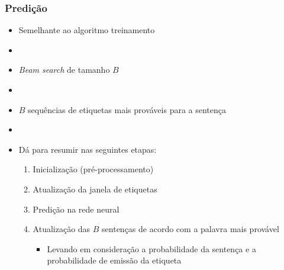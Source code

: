 \documentclass[10pt]{beamer}
\begin{document}
\begin{frame}[fragile]
\frametitle{Predição}
  
  


  \begin{itemize}

    \item Semelhante ao algoritmo treinamento

    \item[\ ] \   

    \item \textit{Beam search} de tamanho $B$

    \item[\ ] \   

    \item $B$ sequências de etiquetas mais prováveis para a sentença

    \item[\ ] \   

    \item Dá para resumir nas seguintes etapas:

    \begin{enumerate}
      \item Inicialização (pré-processamento)
      \item Atualização da janela de etiquetas
      \item Predição na rede neural 
      \item Atualização das $B$ sentenças de acordo com a palavra mais provável
      \begin{itemize}
        \item[-] Levando em consideração a probabilidade da sentença e a probabilidade de emissão da etiqueta
      \end{itemize}
    \end{enumerate}

  \end{itemize}

\end{frame}
\end{document}
